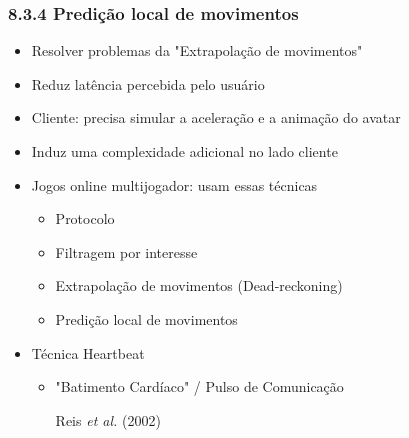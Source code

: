 \documentclass{beamer}
\begin{document}
\begin{frame}
  \frametitle{8.3.4 Predição local de movimentos}
  \begin{itemize}
    \item Resolver problemas da "Extrapolação de movimentos"
    \item Reduz latência percebida pelo usuário
    \item Cliente: precisa simular a aceleração e a animação do avatar
    \item Induz uma complexidade adicional no lado cliente
    \item Jogos online multijogador: usam essas técnicas
    \begin{itemize}
      \item Protocolo
      \item Filtragem por interesse
      \item Extrapolação de movimentos (Dead-reckoning)
      \item Predição local de movimentos
    \end{itemize}
    \item Técnica Heartbeat
    \begin{itemize}
      \item "Batimento Cardíaco" / Pulso de Comunicação
      \begin{flushright}
        \scriptsize
          Reis \textit{et al.} (2002)
        \end{flushright}
      \end{itemize}
  \end{itemize}
\end{frame}
\end{document}
